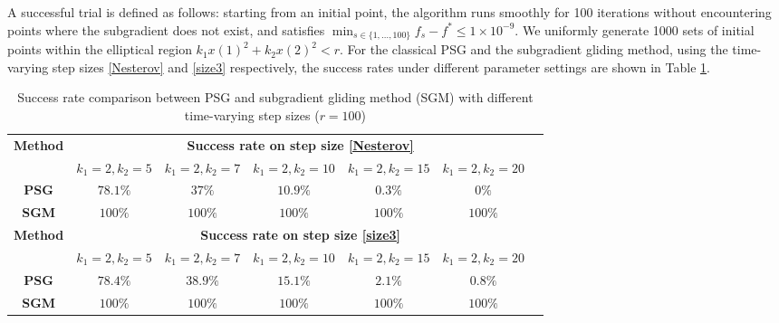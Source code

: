 \documentclass[sn-mathphys]{JORSC-jnl}%
\theoremstyle{thmstyleone}%
\theoremstyle{thmstylethree}%
\begin{document}
A successful trial is defined as follows: starting from an initial point, the algorithm runs smoothly for 100 iterations without encountering points where the subgradient does not exist, and satisfies $\min_{s \in \{1,\dots,100\}} f_s - f^* \le 1 \times 10^{-9}$. We uniformly generate 1000 sets of initial points within the elliptical region $k_1x(1)^2+k_2x(2)^2< r$. For the classical PSG and the subgradient gliding method, using the time-varying step sizes \eqref{Nesterov} and \eqref{size3} respectively, the success rates under different parameter settings are shown in Table \ref{tab:success_rate1}.

\vspace{-4mm}
\begin{table}[htbp]
	\centering
	\caption{Success rate comparison between PSG and subgradient gliding method (SGM) with different time-varying step sizes ($r=100$)}
	\begin{adjustbox}{width=1\textwidth}
		\begin{tabular}{ccccccc}
			\toprule %
			\multirow{2}{*}{\textbf{Method}} & \multicolumn{5}{c}{\textbf{Success rate on step size \eqref{Nesterov}}} & \\
			\cmidrule{2-7} %
			& $k_1=2, k_2=5$ & $k_1=2, k_2=7$ & $k_1=2, k_2=10$ & $k_1=2, k_2=15$ & $k_1=2, k_2=20$ & \\
			\midrule %
			\textbf{PSG} & $78.1\%$& $37\%$& $10.9\%$& $0.3\%$& $0\%$&\\
			\cmidrule{1-7}
			\textbf{SGM} & $100\%$ & $100\%$ & $100\%$ & $100\%$ & $100\%$ &\\
			\cmidrule[1pt]{1-7} %
			\multirow{2}{*}{\textbf{Method}} & \multicolumn{5}{c}{\textbf{Success rate on step size \eqref{size3}}} & \\
			\cmidrule{2-7} %
			& $k_1=2, k_2=5$ & $k_1=2, k_2=7$ & $k_1=2, k_2=10$ & $k_1=2, k_2=15$ & $k_1=2, k_2=20$ & \\
			\midrule %
			\textbf{PSG} & $78.4\%$& $38.9\%$& $15.1\%$& $2.1\%$& $0.8\%$&\\
			\cmidrule{1-7}
			\textbf{SGM} & $100\%$ & $100\%$ & $100\%$ & $100\%$ & $100\%$ &\\
			\bottomrule %
		\end{tabular}
	\end{adjustbox}
	\label{tab:success_rate1}
\end{table}
\vspace{-2mm}
\end{document}
